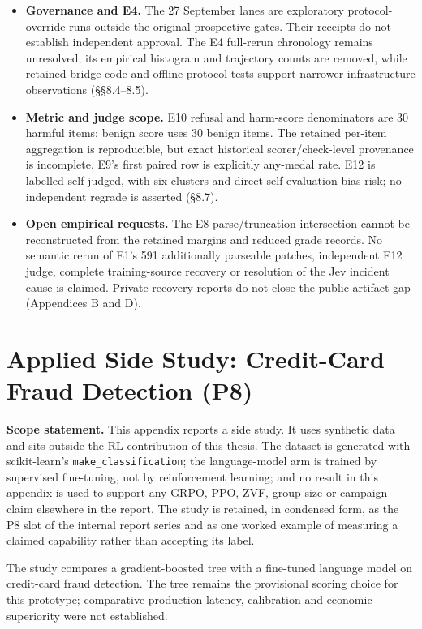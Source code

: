 \documentclass[12pt,a4paper]{report}
\begin{document}
\begin{itemize}
  convergence evidence remain missing (§8.1).
\item
  \textbf{Governance and E4.} The 27 September lanes are exploratory
  protocol-override runs outside the original prospective gates. Their
  receipts do not establish independent approval. The E4 full-rerun
  chronology remains unresolved; its empirical histogram and trajectory
  counts are removed, while retained bridge code and offline protocol
  tests support narrower infrastructure observations (§§8.4--8.5).
\item
  \textbf{Metric and judge scope.} E10 refusal and harm-score
  denominators are 30 harmful items; benign score uses 30 benign items.
  The retained per-item aggregation is reproducible, but exact
  historical scorer/check-level provenance is incomplete. E9's first
  paired row is explicitly any-medal rate. E12 is labelled self-judged,
  with six clusters and direct self-evaluation bias risk; no independent
  regrade is asserted (§8.7).
\item
  \textbf{Open empirical requests.} The E8 parse/truncation intersection
  cannot be reconstructed from the retained margins and reduced grade
  records. No semantic rerun of E1's 591 additionally parseable patches,
  independent E12 judge, complete training-source recovery or resolution
  of the Jev incident cause is claimed. Private recovery reports do not
  close the public artifact gap (Appendices B and D).
\end{itemize}



\chapter{Applied Side Study: Credit-Card Fraud Detection
(P8)}\label{applied-side-study-credit-card-fraud-detection-p8}

\textbf{Scope statement.} This appendix reports a side study. It uses
synthetic data and sits outside the RL contribution of this thesis. The
dataset is generated with scikit-learn's \texttt{make\_classification};
the language-model arm is trained by supervised fine-tuning, not by
reinforcement learning; and no result in this appendix is used to
support any GRPO, PPO, ZVF, group-size or campaign claim elsewhere in
the report. The study is retained, in condensed form, as the P8 slot of
the internal report series and as one worked example of measuring a
claimed capability rather than accepting its label.

The study compares a gradient-boosted tree with a fine-tuned language
model on credit-card fraud detection. The tree remains the provisional
scoring choice for this prototype; comparative production latency,
calibration and economic superiority were not established.
\end{document}
